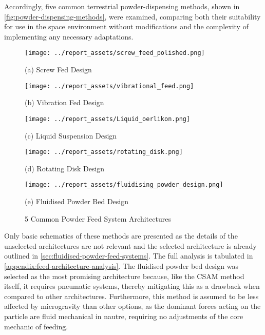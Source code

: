 Accordingly, five common terrestrial powder-dispensing methods, shown in \autoref{fig:powder-dispensing-methods}, were examined, comparing both their suitability for use in the space environment without modifications and the complexity of implementing any necessary adaptations. 
\begin{figure}[htbp]
    \centering

    \begin{minipage}{0.3\textwidth}
        \centering
        \texttt{[image: ../report\_assets/screw\_feed\_polished.png]}
        \caption*{(a) Screw Fed Design~\cite{Bitragunta2015}}
    \end{minipage}
    \hfill
    \begin{minipage}{0.3\textwidth}
        \centering
        \texttt{[image: ../report\_assets/vibrational\_feed.png]}
        \caption*{(b) Vibration Fed Design~\cite{Sinclair2021}}
    \end{minipage}
    \hfill
    \begin{minipage}{0.3\textwidth}
        \centering
        \texttt{[image: ../report\_assets/Liquid\_oerlikon.png]}
        \caption*{(c) Liquid Suspension Design~\cite{OerlikonMetcoFeeders2023}}
    \end{minipage}
    \begin{minipage}{0.35\textwidth}
        \centering
        \texttt{[image: ../report\_assets/rotating\_disk.png]}
        \caption*{(d) Rotating Disk Design~\cite{Crawmer2013}}
    \end{minipage}
    \hspace{0.1\textwidth}
    \begin{minipage}{0.35\textwidth}
        \centering
        \texttt{[image: ../report\_assets/fluidising\_powder\_design.png]}
        \caption*{(e) Fluidised Powder Bed Design~\cite{Li2016}}
    \end{minipage}
    
    \caption{5 Common Powder Feed System Architectures}\label{fig:powder-dispensing-methods}
\end{figure}
Only basic schematics of these methods are presented as the details of the unselected architectures are not relevant and the selected architecture is already outlined in \autoref{sec:fluidised-powder-feed-systems}. The full analysis is tabulated in \autoref{appendix:feed-architecture-analysis}. The fluidised powder bed design was selected as the most promising architecture because, like the CSAM method itself, it requires pneumatic systems, thereby mitigating this as a drawback when compared to other architectures. Furthermore, this method is assumed to be less affected by microgravity than other options, as the dominant forces acting on the particle are fluid mechanical in nautre, requiring no adjustments of the core mechanic of feeding. 

